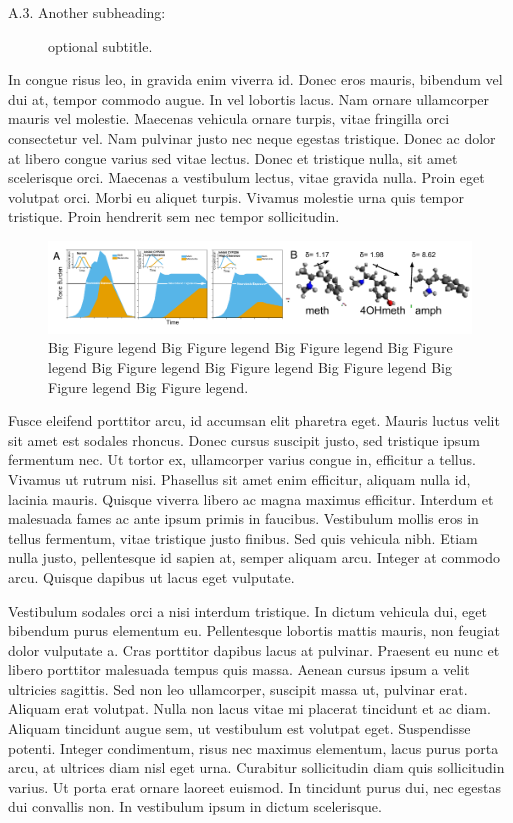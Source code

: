 \documentclass[11pt, notitlepage]{article} %
\begin{document}
\begin{description}
	\item[A.3. Another subheading:]{optional subtitle.}
\end{description}

In congue risus leo, in gravida enim viverra id. Donec eros mauris, bibendum vel dui at, tempor commodo augue. In vel lobortis lacus. Nam ornare ullamcorper mauris vel molestie. Maecenas vehicula ornare turpis, vitae fringilla orci consectetur vel. Nam pulvinar justo nec neque egestas tristique. Donec ac dolor at libero congue varius sed vitae lectus. Donec et tristique nulla, sit amet scelerisque orci. Maecenas a vestibulum lectus, vitae gravida nulla. Proin eget volutpat orci. Morbi eu aliquet turpis. Vivamus molestie urna quis tempor tristique. Proin hendrerit sem nec tempor sollicitudin.

\begin{figure}[b] %
	\centering
	\includegraphics[scale = .80]{Figures/Fig2.pdf}
	\caption{\footnotesize Big Figure legend Big Figure legend Big Figure legend Big Figure legend Big Figure legend Big Figure legend Big Figure legend Big Figure legend Big Figure legend.}
	\label{fig2}
\end{figure}

Fusce eleifend porttitor arcu, id accumsan elit pharetra eget. Mauris luctus velit sit amet est sodales rhoncus. Donec cursus suscipit justo, sed tristique ipsum fermentum nec. Ut tortor ex, ullamcorper varius congue in, efficitur a tellus. Vivamus ut rutrum nisi. Phasellus sit amet enim efficitur, aliquam nulla id, lacinia mauris. Quisque viverra libero ac magna maximus efficitur. Interdum et malesuada fames ac ante ipsum primis in faucibus. Vestibulum mollis eros in tellus fermentum, vitae tristique justo finibus. Sed quis vehicula nibh. Etiam nulla justo, pellentesque id sapien at, semper aliquam arcu. Integer at commodo arcu. Quisque dapibus ut lacus eget vulputate.

Vestibulum sodales orci a nisi interdum tristique. In dictum vehicula dui, eget bibendum purus elementum eu. Pellentesque lobortis mattis mauris, non feugiat dolor vulputate a. Cras porttitor dapibus lacus at pulvinar. Praesent eu nunc et libero porttitor malesuada tempus quis massa. Aenean cursus ipsum a velit ultricies sagittis. Sed non leo ullamcorper, suscipit massa ut, pulvinar erat. Aliquam erat volutpat. Nulla non lacus vitae mi placerat tincidunt et ac diam. Aliquam tincidunt augue sem, ut vestibulum est volutpat eget. Suspendisse potenti. Integer condimentum, risus nec maximus elementum, lacus purus porta arcu, at ultrices diam nisl eget urna. Curabitur sollicitudin diam quis sollicitudin varius. Ut porta erat ornare laoreet euismod. In tincidunt purus dui, nec egestas dui convallis non. In vestibulum ipsum in dictum scelerisque.
\end{document}
